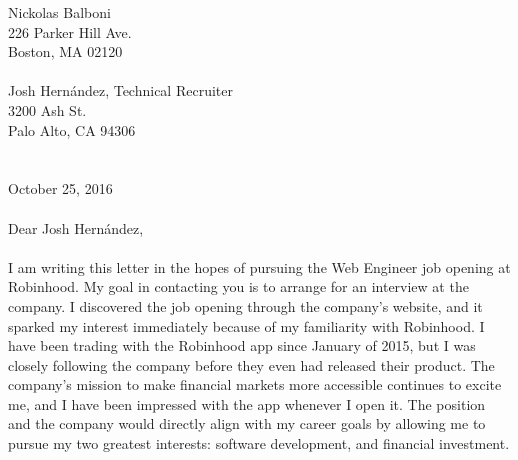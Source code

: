 \documentclass[]{resume}
\begin{document}
	
%
%
\vspace*{\fill}  %
\hspace{-6mm} %
Nickolas Balboni  \\
226 Parker Hill Ave.  \\
Boston, MA 02120  \\
\\
Josh Hern\'{a}ndez, Technical Recruiter \\
3200 Ash St.  \\
Palo Alto, CA 94306  \\
\\~\\
October 25, 2016  \\
\\
Dear Josh Hern\'{a}ndez,  \\
\\

I am writing this letter in the hopes of pursuing the Web Engineer job opening at Robinhood.  My goal in contacting you is to arrange for an interview at the company.  I discovered the job opening through the company's website, and it sparked my interest immediately because of my familiarity with Robinhood.  I have been trading with the Robinhood app since January of 2015, but I was closely following the company before they even had released their product.  The company's mission to make financial markets more accessible continues to excite me, and I have been impressed with the app whenever I open it.  The position and the company would directly align with my career goals by allowing me to pursue my two greatest interests:  software development, and financial investment.  \\
\\
\end{document}
